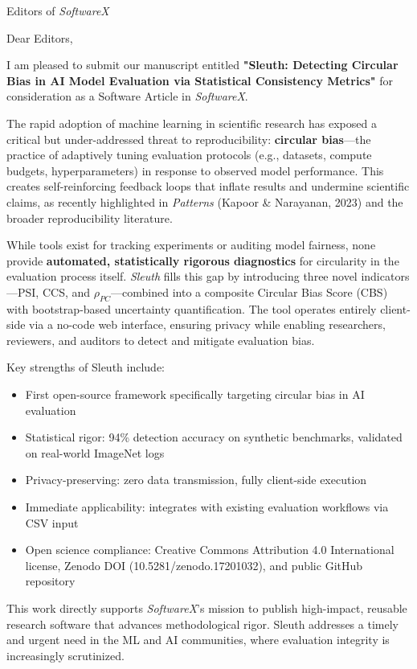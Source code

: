 \documentclass[10pt]{letter}
\begin{document}
\begin{letter}{Editors of \textit{SoftwareX}}

\opening{Dear Editors,}

I am pleased to submit our manuscript entitled \textbf{"Sleuth: Detecting Circular Bias in AI Model Evaluation via Statistical Consistency Metrics"} for consideration as a Software Article in \textit{SoftwareX}.

The rapid adoption of machine learning in scientific research has exposed a critical but under-addressed threat to reproducibility: \textbf{circular bias}—the practice of adaptively tuning evaluation protocols (e.g., datasets, compute budgets, hyperparameters) in response to observed model performance. This creates self-reinforcing feedback loops that inflate results and undermine scientific claims, as recently highlighted in \textit{Patterns} (Kapoor \& Narayanan, 2023) and the broader reproducibility literature.

While tools exist for tracking experiments or auditing model fairness, none provide \textbf{automated, statistically rigorous diagnostics} for circularity in the evaluation process itself. \textit{Sleuth} fills this gap by introducing three novel indicators—PSI, CCS, and $\rho_{PC}$—combined into a composite Circular Bias Score (CBS) with bootstrap-based uncertainty quantification. The tool operates entirely client-side via a no-code web interface, ensuring privacy while enabling researchers, reviewers, and auditors to detect and mitigate evaluation bias.

Key strengths of Sleuth include:
\begin{itemize}
    \item First open-source framework specifically targeting circular bias in AI evaluation
    \item Statistical rigor: 94\% detection accuracy on synthetic benchmarks, validated on real-world ImageNet logs
    \item Privacy-preserving: zero data transmission, fully client-side execution
    \item Immediate applicability: integrates with existing evaluation workflows via CSV input
    \item Open science compliance: Creative Commons Attribution 4.0 International license, Zenodo DOI (10.5281/zenodo.17201032), and public GitHub repository
\end{itemize}

This work directly supports \textit{SoftwareX}'s mission to publish high-impact, reusable research software that advances methodological rigor. Sleuth addresses a timely and urgent need in the ML and AI communities, where evaluation integrity is increasingly scrutinized.


\end{letter}
\end{document}
